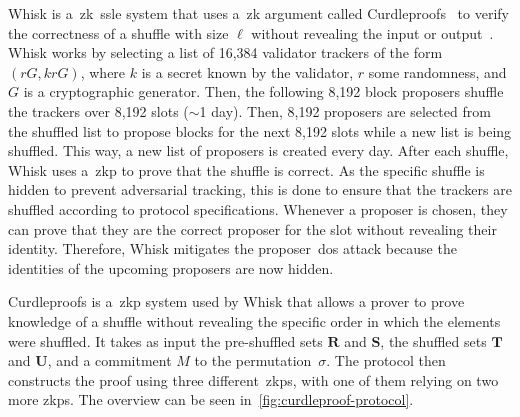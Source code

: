 Whisk is a~\gls{zk}~\gls{ssle} system that uses a~\gls{zk} argument called Curdleproofs~\cite{Curdleproofs} to verify the correctness of a shuffle with size $\ell$ without revealing the input or output~\cite{10.1145/3419614.3423258}.
Whisk works by selecting a list of 16,384 validator trackers of the form $(rG, krG)$, where $k$ is a secret known by the validator, $r$ some randomness, and $G$ is a cryptographic generator.
Then, the following 8,192 block proposers shuffle the trackers over 8,192 slots ($\sim$1 day).
Then, 8,192 proposers are selected from the shuffled list to propose blocks for the next 8,192 slots while a new list is being shuffled.
This way, a new list of proposers is created every day.
After each shuffle, Whisk uses a~\gls{zkp} to prove that the shuffle is correct.
As the specific shuffle is hidden to prevent adversarial tracking, this is done to ensure that the trackers are shuffled according to protocol specifications.
Whenever a proposer is chosen, they can prove that they are the correct proposer for the slot without revealing their identity.
Therefore, Whisk mitigates the proposer~\gls{dos} attack because the identities of the upcoming proposers are now hidden.

Curdleproofs is a~\gls{zkp} system used by Whisk that allows a prover to prove knowledge of a shuffle without revealing the specific order in which the elements were shuffled.
It takes as input the pre-shuffled sets $\mathbf{R}$ and $\mathbf{S}$, the shuffled sets $\mathbf{T}$ and $\mathbf{U}$, and a commitment $M$ to the permutation~$\sigma$.
The protocol then constructs the proof using three different~\glspl{zkp}, with one of them relying on two more \glspl{zkp}.
The overview can be seen in~\autoref{fig:curdleproof-protocol}.

